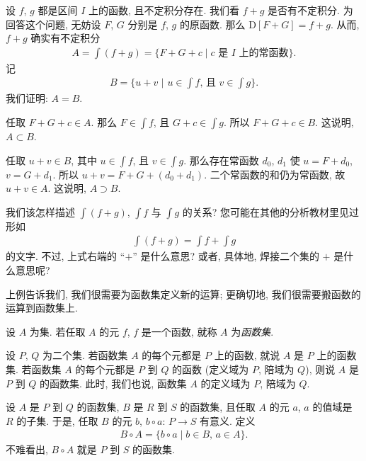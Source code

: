 \begin{example}
    设 $f$, $g$ 都是区间 $I$ 上的函数, 且不定积分存在.
    我们看 $f + g$ 是否有不定积分.
    为回答这个问题, 无妨设 $F$, $G$ 分别是 $f$, $g$ 的原函数.
    那么 $\mathrm{D}[F + G] = f + g$.
    从而, $f + g$ 确实有不定积分
    \begin{align*}
        A = \int {(f + g)} = \{ F + G + c \mid \text{$c$ 是 $I$ 上的常函数} \}.
    \end{align*}
    记
    \begin{align*}
        B = \Bigg\{ u + v \,\,\Bigg|\,\, \text{$u \in \int {f}$, 且 $v \in \int {g}$} \Bigg\}.
    \end{align*}
    我们证明: $A = B$.

    任取 $F + G + c \in A$.
    那么 $F \in \int {f}$, 且 $G + c \in \int {g}$.
    所以 $F + G + c \in B$.
    这说明, $A \subset B$.

    任取 $u + v \in B$,
    其中 $u \in \int {f}$, 且 $v \in \int {g}$.
    那么存在常函数 $d_0$, $d_1$ 使
    $u = F + d_0$, $v = G + d_1$.
    所以 $u + v = F + G + (d_0 + d_1)$.
    二个常函数的和仍为常函数, 故 $u + v \in A$.
    这说明, $A \supset B$.

    我们该怎样描述
    $\int {(f + g)}$, $\int {f}$ 与 $\int {g}$ 的关系?
    您可能在其他的分析教材里见过形如
    \begin{align*}
        \int {(f + g)} = \int {f} + \int {g}
    \end{align*}
    的文字.
    不过, 上式右端的 ``$+$'' 是什么意思?
    或者, 具体地, 焊接二个集的 $+$ 是什么意思呢?
\end{example}

上例告诉我们, 我们很需要为函数集定义新的运算;
更确切地, 我们很需要搬函数的运算到函数集上.

\begin{definition}
    设 $A$ 为集.
    若任取 $A$ 的元 $f$, $f$ 是一个函数,
    就称 $A$ 为\emph{函数集}.

    设 $P$, $Q$ 为二个集.
    若函数集 $A$ 的每个元都是 $P$ 上的函数,
    就说 $A$ 是 $P$ 上的函数集.
    若函数集 $A$ 的每个元都是 $P$ 到 $Q$ 的函数
    (定义域为 $P$, 陪域为 $Q$),
    则说 $A$ 是 $P$ 到 $Q$ 的函数集.
    此时, 我们也说,
    函数集 $A$ 的定义域为 $P$, 陪域为 $Q$.
\end{definition}

\begin{definition}
    设 $A$ 是 $P$ 到 $Q$ 的函数集,
    $B$ 是 $R$ 到 $S$ 的函数集,
    且任取 $A$ 的元 $a$, $a$ 的值域是 $R$ 的子集.
    于是, 任取 $B$ 的元 $b$, $b \circ a$: $P \to S$ 有意义.
    定义
    \begin{align*}
        B \circ A = \{ b \circ a \mid \text{$b \in B$, $a \in A$} \}.
    \end{align*}
    不难看出, $B \circ A$ 就是 $P$ 到 $S$ 的函数集.
\end{definition}

